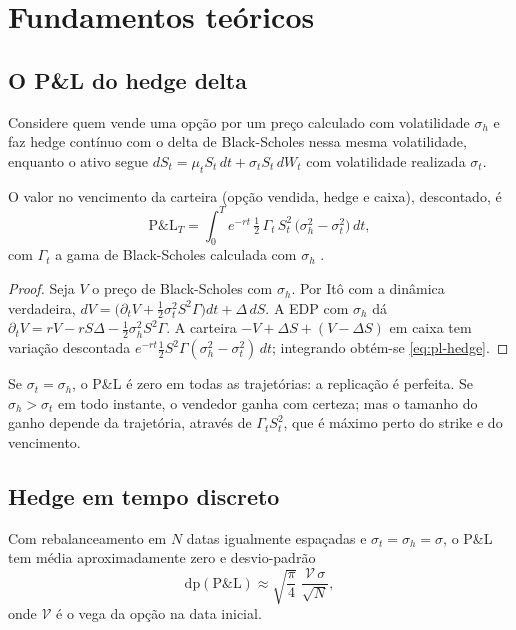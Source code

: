 \section{Fundamentos teóricos}

\subsection{O P\&L do hedge delta}

Considere quem vende uma opção por um preço calculado com volatilidade $\sigma_h$ e faz hedge contínuo com o delta de Black-Scholes nessa mesma volatilidade, enquanto o ativo segue $dS_t=\mu_tS_t\,dt+\sigma_tS_t\,dW_t$ com volatilidade realizada $\sigma_t$.

\begin{proposicao}\label{prop:pl-hedge}
O valor no vencimento da carteira (opção vendida, hedge e caixa), descontado, é
\begin{equation}\label{eq:pl-hedge}
\mathrm{P\&L}_T=\int_0^Te^{-rt}\,\tfrac12\,\Gamma_t\,S_t^2\,\big(\sigma_h^2-\sigma_t^2\big)\,dt,
\end{equation}
com $\Gamma_t$ a gama de Black-Scholes calculada com $\sigma_h$ \citep{elkaroui1998}.
\end{proposicao}

\begin{proof}
Seja $V$ o preço de Black-Scholes com $\sigma_h$. Por Itô com a dinâmica verdadeira, $dV=\big(\partial_tV+\tfrac12\sigma_t^2S^2\Gamma\big)dt+\Delta\,dS$. A EDP com $\sigma_h$ dá $\partial_tV=rV-rS\Delta-\tfrac12\sigma_h^2S^2\Gamma$. A carteira $-V+\Delta S+(V-\Delta S)$ em caixa tem variação descontada $e^{-rt}\tfrac12S^2\Gamma(\sigma_h^2-\sigma_t^2)\,dt$; integrando obtém-se \eqref{eq:pl-hedge}.
\end{proof}

\begin{corolario}
Se $\sigma_t=\sigma_h$, o P\&L é zero em todas as trajetórias: a replicação é perfeita. Se $\sigma_h>\sigma_t$ em todo instante, o vendedor ganha com certeza; mas o tamanho do ganho depende da trajetória, através de $\Gamma_tS_t^2$, que é máximo perto do strike e do vencimento.
\end{corolario}

\subsection{Hedge em tempo discreto}

\begin{proposicao}
Com rebalanceamento em $N$ datas igualmente espaçadas e $\sigma_t=\sigma_h=\sigma$, o P\&L tem média aproximadamente zero e desvio-padrão
\begin{equation}
\mathrm{dp}(\mathrm{P\&L})\approx\sqrt{\frac{\pi}{4}}\;\frac{\mathcal V\,\sigma}{\sqrt N},
\end{equation}
onde $\mathcal V$ é o vega da opção na data inicial.
\end{proposicao}

